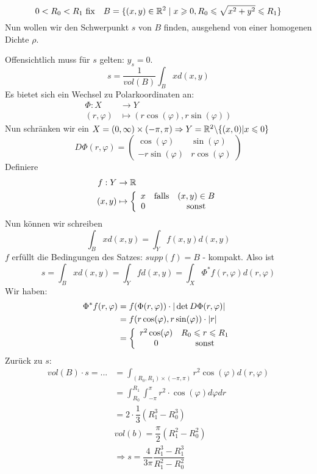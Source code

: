 \documentclass[main.tex]{subfiles}
\begin{document}
\begin{Beispiel}
  $$0 < R_0 < R_1 \text{ fix} \quad B =\{(x,y) \in \R^2 \mid x \geq 0, R_0 \leq \sqrt{x^2 +y^2} \leq R_1\}$$
  Nun wollen wir den Schwerpunkt $s$ von $B$ finden, ausgehend von einer homogenen Dichte $\rho$.

  Offensichtlich muss für $s$ gelten: $y_s = 0$.
  $$s = \dfrac{1}{vol(B)} \int_B x d(x,y)$$
  Es bietet sich ein Wechsel zu Polarkoordinaten an:
  $$\begin{aligned}
    \Phi : X & \to Y \\
    (r,\varphi) & \mapsto (r \cos(\varphi),r\sin(\varphi))
  \end{aligned}$$
  Nun schränken wir ein $X = (0, \infty) \times (-\pi,\pi) \Rightarrow Y = \R^2 \backslash \{(x,0) | x \leq 0\}$
  $$D \Phi (r,\varphi) = \begin{pmatrix}
    \cos(\varphi) & \sin(\varphi) \\
    -r \sin(\varphi) & r \cos(\varphi)
  \end{pmatrix}$$
  Definiere
  $$\begin{aligned}
    f: Y & \to \R \\
    (x,y) & \mapsto \left\{ \begin{array}{c c c}
      x & \text{falls} & (x,y) \in B \\
      0 & & \text{sonst}
    \end{array}\right.
  \end{aligned}$$
  Nun können wir schreiben
  $$\int_B x d(x,y) = \int_Y f(x,y) d (x,y)$$
  $f$ erfüllt die Bedingungen des Satzes: $supp(f) = B$ - kompakt. Also ist
  $$s = \int_B x d(x,y) = \int_Y f d(x,y) = \int_X \Phi^* f (r, \varphi) d(r, \varphi)$$
  Wir haben:
  $$\begin{aligned}
    \Phi^* f (r,\varphi) & = f(\Phi(r,\varphi)) \cdot |\det D\Phi(r, \varphi)| \\
    & = f(r\cos(\varphi),r \sin(\varphi)) \cdot |r| \\
    & = \left\{\begin{array}{c c}
      r^2 \cos(\varphi) & R_0 \leq r \leq R_1 \\
      0 & \text{sonst}
    \end{array}\right.
  \end{aligned}$$
  Zurück zu $s$:
  $$\begin{aligned}
    vol(B) \cdot s = ... & = \int_{(R_0,R_1) \times (-\pi , \pi)} r^2 \cos(\varphi) d(r,\varphi) \\
    & = \int_{R_0}^{R_1} \int_{-\pi}^\pi r^2 \cdot \cos(\varphi) d \varphi dr \\
    & = 2 \cdot \dfrac{1}{3}(R_1^3 - R_0^3) \\
    & vol(b) = \dfrac{\pi}{2} (R_1^2 - R_0^2) \\
    & \Rightarrow s = \dfrac{4}{3 \pi} \dfrac{R_1^3 - R_1^3}{R_1^2 - R_0^2}
  \end{aligned}$$
\end{Beispiel}
\end{document}
